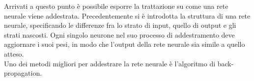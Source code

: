 Arrivati a questo punto è possibile esporre la trattazione su come una rete neurale viene addestrata. Precedentemente si è introdotta la struttura di una rete neurale, specificando le differenze fra lo strato di input, quello di output e gli strati nascosti. Ogni singolo neurone nel suo processo di addestramento deve aggiornare i suoi pesi, in modo che l'output della rete neurale sia simile a quello atteso.\\
Uno dei metodi migliori per addestrare la rete neurale è l'algoritmo di back-propagation. \\
